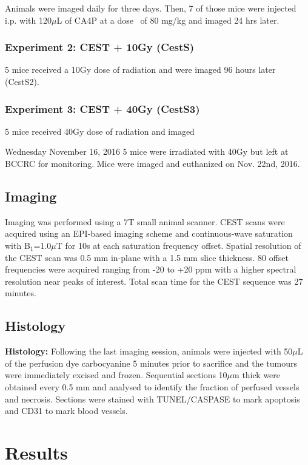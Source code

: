 Animals were imaged daily for three days.
Then, 7 of those mice were injected i.p.
with 120$\mu$L of CA4P at a dose~\cite{Maxwell:2002da} of 80 mg/kg and imaged 24 hrs later.


\subsubsection{Experiment 2: CEST + 10Gy (CestS)}

5 mice received a 10Gy dose of radiation and were imaged 96 hours later (CestS2).


\subsubsection{Experiment 3: CEST + 40Gy (CestS3)}

5 mice received 40Gy dose of radiation and imaged 

Wednesday November 16, 2016 5 mice were irradiated with 40Gy but left at BCCRC for monitoring.
Mice were imaged and euthanized on Nov.
22nd, 2016.

\subsection{Imaging}

Imaging was performed using a 7T small animal scanner.
CEST scans were acquired using an EPI-based imaging scheme and continuous-wave saturation with B$_1$=1.0$\mu$T for 10s at each saturation frequency offset.
Spatial resolution of the CEST scan was 0.5 mm in-plane with a 1.5 mm slice thickness.
80 offset frequencies were acquired ranging from -20 to +20 ppm with a higher spectral resolution near peaks of interest.
Total scan time for the CEST sequence was 27 minutes.

\subsection{Histology}

\textbf{Histology:} Following the last imaging session, animals were injected with 50$\mu$L of the perfusion dye carbocyanine 5 minutes prior to sacrifice and the tumours were immediately excised and frozen.
Sequential sections 10$\mu$m thick were obtained every 0.5 mm and analysed to identify the fraction of perfused vessels and necrosis.
Sections were stained with TUNEL/CASPASE to mark apoptosis and CD31 to mark blood vessels.


\section{Results}

